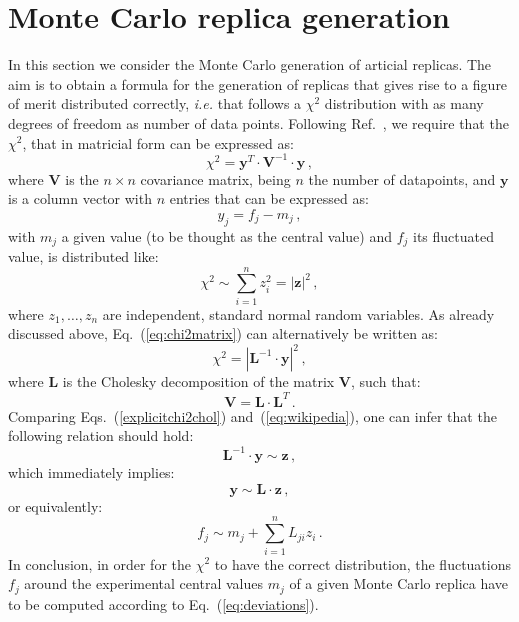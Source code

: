 \documentclass[10pt,a4paper]{article}
\begin{document}
\section{Monte Carlo replica generation}

In this section we consider the Monte Carlo generation of articial
replicas. The aim is to obtain a formula for the generation of
replicas that gives rise to a figure of merit distributed correctly,
\textit{i.e.} that follows a $\chi^2$ distribution with as many
degrees of freedom as number of data points. Following
Ref.~\cite{wiki:xxx}, we require that the $\chi^2$, that in matricial
form can be expressed as:
\begin{equation}\label{eq:chi2matrix}
  \chi^2 = \mathbf{y}^{T}\cdot \mathbf{V}^{-1} \cdot \mathbf{y}\,,
\end{equation}
where $\mathbf{V}$ is the $n\times n$ covariance matrix, being $n$ the
number of datapoints, and $\mathbf{y}$ is a column vector with $n$
entries that can be expressed as:
\begin{equation}
y_j = f_j-m_j\,,
\end{equation}
with $m_j$ a given value (to be thought as the central value) and
$f_j$ its fluctuated value, is distributed like:
\begin{equation}\label{eq:wikipedia}
\chi^2\sim \sum_{i=1}^{n}z_i^2=|\mathbf{z}|^2\,,
\end{equation}
where $z_1,\dots , z_n$ are independent, standard normal random
variables. As already discussed above, Eq.~(\ref{eq:chi2matrix}) can
alternatively be written as:
\begin{equation}\label{explicitchi2chol}
\chi^2 = \left|\mathbf{L}^{-1}\cdot \mathbf{y}\right|^2\,,
\end{equation}
where $\mathbf{L}$ is the Cholesky decomposition of the matrix
$\mathbf{V}$, such that:
\begin{equation}\label{eq:choleskydecagain}
\mathbf{V} = \mathbf{L}\cdot\mathbf{L}^{T}\,.
\end{equation}
Comparing Eqs.~(\ref{explicitchi2chol}) and~(\ref{eq:wikipedia}), one
can infer that the following relation should hold:
\begin{equation}
\mathbf{L}^{-1}\cdot \mathbf{y}\sim\mathbf{z}\,,
\end{equation}
which immediately implies:
\begin{equation}
\mathbf{y}\sim\mathbf{L}\cdot\mathbf{z}\,,
\end{equation}
or equivalently:
\begin{equation}\label{eq:deviations}
f_j\sim m_j+\sum_{i=1}^nL_{ji}z_i\,.
\end{equation}
In conclusion, in order for the $\chi^2$ to have the correct
distribution, the fluctuations $f_j$ around the experimental central
values $m_j$ of a given Monte Carlo replica have to be computed
according to Eq.~(\ref{eq:deviations}).
\end{document}
